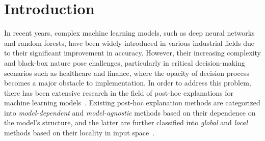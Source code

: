 \documentclass[runningheads]{llncs}
\begin{document}
\section{Introduction}
In recent years,
complex machine learning models, such as deep neural networks and random forests,
have been widely introduced in various industrial fields
due to their significant improvement in accuracy.
However,
their increasing complexity and black-box nature pose challenges,
particularly in critical decision-making scenarios such as healthcare and finance,
where the opacity of decision process becomes a major obstacle to implementation.
In order to address this problem,
there has been extensive research in the field of post-hoc explanations
for machine learning models~\cite{%
  guidotti2018local,radulovic2023bella,ribeiro2016why,ribeiro2018anchors}.
Existing post-hoc explanation methods are categorized
into \emph{model-dependent} and \emph{model-agnostic} methods
based on their dependence on the model's structure,
and the latter are further classified into \emph{global} and \emph{local} methods
based on their locality in input space~\cite{samek2021explaining}.
\end{document}

